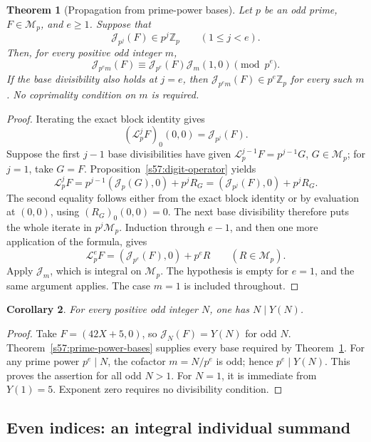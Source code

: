 \documentclass[11pt,a4paper]{article}
\numberwithin{equation}{section}
\newtheorem{theorem}{Theorem}[section]
\newtheorem{corollary}[theorem]{Corollary}
\theoremstyle{remark}
\begin{document}
\begin{theorem}[Propagation from prime-power bases]
\label{s57:propagation}
Let \(p\) be an odd prime, \(F\in\mathcal M_p\), and \(e\ge1\).
Suppose that
\[
            \mathcal J_{p^j}(F)\in p^j\mathbb Z_p
                    \qquad(1\le j<e).
\]
Then, for every positive odd integer \(m\),
\[
 \mathcal J_{p^em}(F)
    \equiv \mathcal J_{p^e}(F)\mathcal J_m(1,0)\pmod{p^e}.
\]
If the base divisibility also holds at \(j=e\), then
\(\mathcal J_{p^em}(F)\in p^e\mathbb Z_p\) for every such \(m\).
No coprimality condition on \(m\) is required.
\end{theorem}
\begin{proof}
Iterating the exact block identity gives
\[
                  (\mathcal L_p^jF)_0(0,0)=\mathcal J_{p^j}(F).
\]
Suppose the first \(j-1\) base divisibilities have given
\(\mathcal L_p^{j-1}F=p^{j-1}G\), \(G\in\mathcal M_p\); for
\(j=1\), take \(G=F\). Proposition~\ref{s57:digit-operator} yields
\[
 \mathcal L_p^jF
   =p^{j-1}(\mathcal J_p(G),0)+p^jR_G
   =(\mathcal J_{p^j}(F),0)+p^jR_G.
\]
The second equality follows either from the exact block identity or
by evaluation at \((0,0)\), using \((R_G)_0(0,0)=0\).
The next base divisibility therefore puts the whole iterate in
\(p^j\mathcal M_p\). Induction through \(e-1\), and then one
more application of the formula, gives
\[
       \mathcal L_p^eF=(\mathcal J_{p^e}(F),0)+p^eR
                    \qquad(R\in\mathcal M_p).
\]
Apply \(\mathcal J_m\), which is integral on \(\mathcal M_p\).
The hypothesis is empty for \(e=1\), and the same argument applies.
The case \(m=1\) is included throughout.
\end{proof}

\begin{corollary}
\label{s57:odd-diagonal-integrality}
For every positive odd integer \(N\), one has \(N\mid Y(N)\).
\end{corollary}
\begin{proof}
Take \(F=(42X+5,0)\), so \(\mathcal J_N(F)=Y(N)\) for odd
\(N\). Theorem~\ref{s57:prime-power-bases} supplies every base
required by Theorem~\ref{s57:propagation}. For any prime power
\(p^e\mid N\), the cofactor \(m=N/p^e\) is odd; hence
\(p^e\mid Y(N)\). This proves the assertion for all odd \(N>1\).
For \(N=1\), it is immediate from \(Y(1)=5\). Exponent zero
requires no divisibility condition.
\end{proof}

\subsection{Even indices: an integral individual summand}
\end{document}
